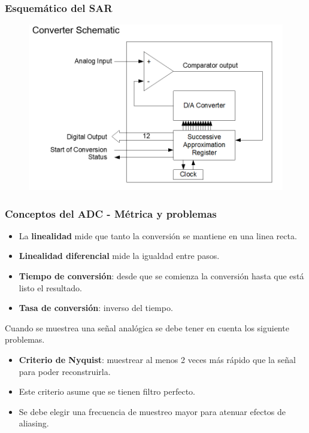 \documentclass[10.5pt,scale=1.0,t,aspectratio=169,hyperref={pdfpagelabels=false}]{beamer}
\begin{document}
\begin{frame}
	\frametitle{Esquemático del SAR}
	\begin{figure}
		\centering\includegraphics[scale=0.45]{fig_SARSchematic}
	\end{figure}
\end{frame}
\begin{frame}
	\frametitle{Conceptos del ADC - Métrica y problemas}
	{\small
		\begin{itemize}
			\item La \textbf{linealidad} mide que tanto la conversión se mantiene en una linea recta.
			\item \textbf{Linealidad diferencial} mide la igualdad entre pasos.
			\item \textbf{Tiempo de conversión}: desde que se comienza la conversión hasta que está listo el resultado.
			\item \textbf{Tasa de conversión}: inverso del tiempo. 
		\end{itemize}
	
		Cuando se muestrea una señal analógica se debe tener en cuenta los siguiente problemas.
		\begin{itemize}
			\item \textbf{Criterio de Nyquist}: muestrear al menos 2 veces más rápido que la señal para poder reconstruirla. 
			\item Este criterio asume que se tienen filtro perfecto.
			\item Se debe elegir una frecuencia de muestreo mayor para atenuar efectos de aliasing. 
		\end{itemize}
	}	
\end{frame}
\end{document}

